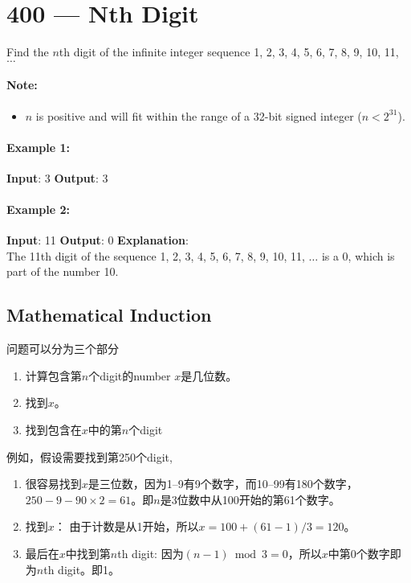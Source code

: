 \section{400 --- Nth Digit}
Find the $n$th digit of the infinite integer sequence 1, 2, 3, 4, 5, 6, 7, 8, 9, 10, 11, $\ldots$

\paragraph{Note:}
\begin{itemize}
\item $ n $ is positive and will fit within the range of a 32-bit signed integer ($n < 2^{31}$).
\end{itemize}

\paragraph{Example 1:}

\begin{flushleft}
\textbf{Input}: 3
\textbf{Output}: 3
\end{flushleft}

\paragraph{Example 2:}

\begin{flushleft}
\textbf{Input}: 11
\textbf{Output}: 0
\textbf{Explanation}:
\\
The 11th digit of the sequence 1, 2, 3, 4, 5, 6, 7, 8, 9, 10, 11, $\ldots$ is a 0, which is part of the number 10.
\end{flushleft}

\subsection{Mathematical Induction}
问题可以分为三个部分
\begin{enumerate}
\item 计算包含第$n$个digit的number $x$是几位数。
\item 找到$x$。
\item 找到包含在$x$中的第$n$个digit
\end{enumerate}
例如，假设需要找到第250个digit,
\begin{enumerate}
\item 很容易找到$x$是三位数，因为1--9有9个数字，而10--99有180个数字，$250 - 9 - 90 \times 2 = 61$。即$n$是3位数中从100开始的第61个数字。
\item 找到$x$： 由于计数是从1开始，所以$x=100+(61-1)/3=120$。
\item 最后在$x$中找到第$n$th digit: 因为$(n-1)\bmod 3=0$，所以$x$中第0个数字即为$n$th digit。即1。
\end{enumerate}

